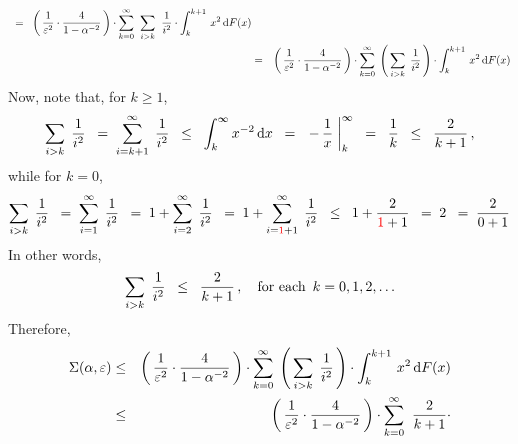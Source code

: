 \begin{enumerate}
\begin{eqnarray*}
	\;\; = \;\;
	\left(\,\dfrac{1}{\varepsilon^{2}} \cdot \dfrac{4}{1-\alpha^{-2}}\,\right) \cdot
	\overset{\infty}{\underset{k=0}{\sum}}\;\;
	\underset{i > k}{\sum}\;\;
	\dfrac{1}{i^{2}} \cdot  \int_{k}^{k+1}\, x^{2} \,\textnormal{d} F(x)
\\
& = &
	\left(\,\dfrac{1}{\varepsilon^{2}} \cdot \dfrac{4}{1-\alpha^{-2}}\,\right) \cdot
	\overset{\infty}{\underset{k=0}{\sum}}\;
	\left(\,\underset{i > k}{\sum}\;\, \dfrac{1}{i^{2}}\,\right) \cdot
	\int_{k}^{k+1}\, x^{2} \,\textnormal{d} F(x)
\end{eqnarray*}
Now, note that, for $k \geq 1$,
\begin{equation*}
\underset{i > k}{\sum}\;\, \dfrac{1}{i^{2}}
\;\; = \;
	\overset{\infty}{\underset{i = k+1}{\sum}}\;\, \dfrac{1}{i^{2}}
\;\; \leq \;\;
	\int_{k}^{\infty}x^{-2}\,\textnormal{d} x
\;\; = \;\;
	\left. -\,\dfrac{1}{x}\;\right\vert_{k}^{\infty}
\;\; = \;\;
	\dfrac{1}{k}
\;\; \leq \;\;
	\dfrac{2}{k+1}\,,
\end{equation*}
while for $k = 0$,
\begin{equation*}
\underset{i > k}{\sum}\;\, \dfrac{1}{i^{2}}
\;\; = \;
	\overset{\infty}{\underset{i = 1}{\sum}}\;\, \dfrac{1}{i^{2}}
\;\; = \;
	1 + \overset{\infty}{\underset{i = 2}{\sum}}\;\, \dfrac{1}{i^{2}}
\;\; = \;
	1 + \overset{\infty}{\underset{i = {\color{red}1}+1}{\sum}}\;\, \dfrac{1}{i^{2}}
\;\; \leq \;\;
	1 + \dfrac{2}{{\color{red}1}+1}
\;\; = \;
	2
\;\; = \;
	\dfrac{2}{0 + 1}
\end{equation*}
In other words,
\begin{equation*}
\underset{i > k}{\sum}\;\, \dfrac{1}{i^{2}}
\;\; \leq \;\;
	\dfrac{2}{k + 1}\,,
\quad\textnormal{for each \,$k = 0, 1, 2, \ldots$}
\end{equation*}
Therefore,
\begin{eqnarray*}
\Sigma(\alpha,\varepsilon)
& \leq &
	\left(\,\dfrac{1}{\varepsilon^{2}} \cdot \dfrac{4}{1-\alpha^{-2}}\,\right) \cdot
	\overset{\infty}{\underset{k=0}{\sum}}\;
	\left(\,\underset{i > k}{\sum}\;\, \dfrac{1}{i^{2}}\,\right) \cdot
	\int_{k}^{k+1}\, x^{2} \,\d F(x)
\\
& \leq &
	\left(\,\dfrac{1}{\varepsilon^{2}} \cdot \dfrac{4}{1-\alpha^{-2}}\,\right) \cdot
		\overset{\infty}{\underset{k=0}{\sum}}\;\;
		\dfrac{2}{k+1} \cdot

\end{eqnarray*}
\end{enumerate}
